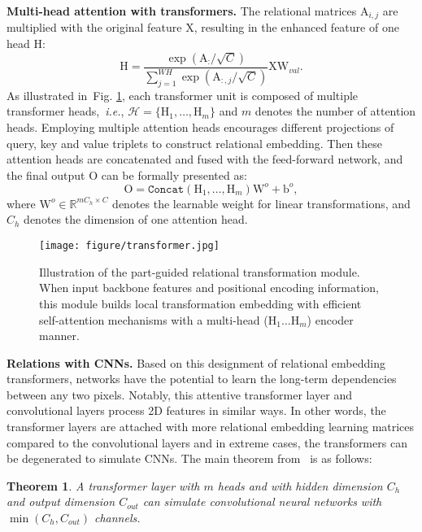 \documentclass[journal]{IEEEtran}
\def\ie{{\em i.e.}}
\newcommand{\figref}[1]{Fig. \ref{#1}}
\newcommand{\mc}[1]{\mathcal{#1}}
\newcommand{\br}[1]{\bm{\mathrm{#1}}}
\newcommand{\bs}[1]{\boldsymbol{\texttt{#1}}}
\begin{document}
\textbf{Multi-head attention with transformers.}
The relational matrices $\br{A}_{i,j}$ are multiplied with the original feature $\br{X}$, resulting in the enhanced feature of one head $\br{H}$:
\begin{equation}\label{eq:onehead}
\br{H}= \frac{\exp(\br{A}_{:} / \sqrt{C} )} {\sum_{j=1}^{WH} \exp(\br{A}_{:,j} / \sqrt{C} ) } \br{X} \br{W}_{val}.
\end{equation}
As illustrated in~\figref{fig:transformer}, each transformer unit is composed of multiple transformer heads,~\ie, $\mc{H} = \{ \br{H}_1,\ldots,\br{H}_m\}$ and $m$ denotes the number of attention heads. Employing multiple attention heads encourages different projections of query, key and value triplets to construct relational embedding. Then these attention heads are concatenated and fused with the feed-forward network, and the final output $\br{O}$ can be formally presented as:
\begin{equation}\label{eq:multihead}
\br{O}= \bs{Concat}(\br{H}_1,\ldots,\br{H}_m)\br{W}^o + \br{b}^o,
\end{equation}
where $\br{W}^o \in \mathbb{R}^{mC_h \times C} $ denotes the learnable weight for linear transformations, and $C_h$ denotes the dimension of one attention head.


\begin{figure}[!t]
	\centering
	\texttt{[image: figure/transformer.jpg]}
	\caption{Illustration of the part-guided relational transformation module. When input backbone features and positional encoding information, this module builds local transformation embedding with efficient self-attention mechanisms with a multi-head ($\br{H}_1 \ldots \br{H}_m$) encoder manner.
	}
	\label{fig:transformer}
\end{figure}

\textbf{Relations with CNNs.}
Based on this designment of relational embedding transformers, networks have the potential to learn the long-term dependencies between any two pixels. Notably, this attentive transformer layer and convolutional layers process 2D features in similar ways. In other words, the transformer layers are attached with more relational embedding learning matrices compared to the convolutional layers and in extreme cases, the transformers can be degenerated to simulate CNNs. The main theorem from~\cite{cordonnier2020relationship} is as follows:
\newtheorem{thm}{\bf Theorem}[section]
\begin{thm}\label{thm1}
A transformer layer with $m$ heads and with hidden dimension $C_h$ and output dimension $C_{out}$ can simulate convolutional neural networks with $\min(C_h, C_{out})$ channels.
\end{thm}
\end{document}
